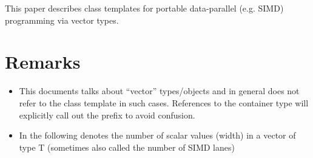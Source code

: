 \newcommand\wgTitle{Data-Parallel Vector Types \& Operations}
\newcommand\wgName{Matthias Kretz <kretz@compeng.uni-frankfurt.de>}
\newcommand\wgVersion{Version 1}
\newcommand\wgDocumentNumber{D0XXXR0}
\newcommand\wgPreviousDocumentNumber{N4184, N4185, N4395}
\newcommand\wgAcknowledgements{
  This work was supported by GSI Helmholtzzentrum für Schwerionenforschung
  and the Hessian LOEWE initiative through the Helmholtz International Center
  for FAIR (HIC for FAIR).
}

\usepackage{underscore}
\usepackage{typenames}
\usepackage{mymacros}
\usepackage{wg21}




\begin{wgTitlepage}
  This paper describes class templates for portable data-parallel (e.g. SIMD) programming via vector types.
\end{wgTitlepage}

\pagestyle{scrheadings}
\addtocounter{section}{-1}
\section{Remarks}
\begin{itemize}
  \item This documents talks about “vector” types/objects and in general does not refer to the \std{} class template in such cases.
    References to the container type will explicitly call out the  prefix to avoid confusion.
  \item In the following  denotes the number of scalar values (width) in a vector of type \type T (sometimes also called the number of SIMD lanes)
\end{itemize}




